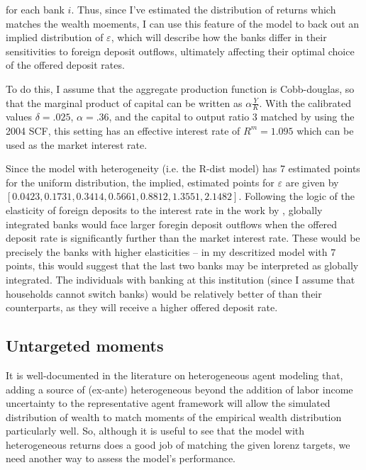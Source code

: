  for each bank $i$. Thus, since I've estimated the distribution of returns which matches the wealth moements, I can use this feature of the model to back out an implied distribution of $\varepsilon$, which will describe how the banks differ in their sensitivities to foreign deposit outflows, ultimately affecting their optimal choice of the offered deposit rates. 

  \par To do this, I assume that the aggregate production function is Cobb-douglas, so that the marginal product of capital can be written as $\alpha \frac{Y}{K}$. With the calibrated values  $\delta = .025$, $\alpha = .36$, and the capital to output ratio $3$  matched by using the 2004 SCF, this setting has an effective interest rate of $R^m = 1.095$ which can be used as the market interest rate.

  \par Since the model with heterogeneity (i.e. the R-dist model) has 7 estimated points for the uniform distribution, the implied, estimated points for $\varepsilon$ are given by $[ 0.0423, 0.1731, 0.3414, 0.5661, 0.8812, 1.3551, 2.1482 ]$. Following the logic of the  elasticity of foreign deposits to the interest rate in the work by \cite{Sarkisyan2021}, globally integrated banks would face larger foregin deposit outflows when the offered deposit rate is significantly further than the market interest rate. These would be precisely the banks with higher elasticities -- in my descritized model with 7 points, this would suggest that the last two banks may be interpreted as globally integrated. The individuals  with banking at this institution (since I assume that households cannot switch banks) would be relatively better of than their counterparts, as they will receive a higher offered deposit rate.  
 

\subsection{Untargeted moments}

\par It is well-documented in the literature on heterogeneous agent modeling that, adding a source of (ex-ante) heterogeneous beyond the addition of labor income uncertainty to the representative agent framework will allow the simulated distribution of wealth to match moments of the empirical wealth distribution particularly well. So, although it is useful to see that the model with heterogeneous returns does a good job of matching the given lorenz targets, we need another way to assess the model's performance.


